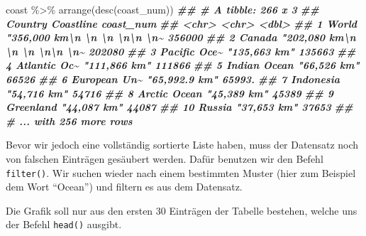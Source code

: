 \documentclass[11pt,german,a4paper]{article}
\newenvironment{Shaded}{\begin{snugshade}}{\end{snugshade}}
\newcommand{\DocumentationTok}[1]{\textcolor[rgb]{0.56,0.35,0.01}{\textbf{\textit{#1}}}}
\newcommand{\FunctionTok}[1]{\textcolor[rgb]{0.00,0.00,0.00}{#1}}
\newcommand{\NormalTok}[1]{#1}
\newcommand{\SpecialCharTok}[1]{\textcolor[rgb]{0.00,0.00,0.00}{#1}}
\begin{document}
\begin{Shaded}
\begin{Highlighting}[]
\NormalTok{coast }\SpecialCharTok{\%\textgreater{}\%}
  \FunctionTok{arrange}\NormalTok{(}\FunctionTok{desc}\NormalTok{(coast\_num))}
\DocumentationTok{\#\# \# A tibble: 266 x 3}
\DocumentationTok{\#\#    Country      Coastline                                              coast\_num}
\DocumentationTok{\#\#    \textless{}chr\textgreater{}        \textless{}chr\textgreater{}                                                      \textless{}dbl\textgreater{}}
\DocumentationTok{\#\#  1 World        "356,000 km\textbackslash{}n          \textbackslash{}n          \textbackslash{}n        \textbackslash{}n\textbackslash{}n  \textbackslash{}n\textasciitilde{}   356000 }
\DocumentationTok{\#\#  2 Canada       "202,080 km\textbackslash{}n          \textbackslash{}n          \textbackslash{}n        \textbackslash{}n\textbackslash{}n  \textbackslash{}n\textasciitilde{}   202080 }
\DocumentationTok{\#\#  3 Pacific Oce\textasciitilde{} "135,663 km"                                             135663 }
\DocumentationTok{\#\#  4 Atlantic Oc\textasciitilde{} "111,866 km"                                             111866 }
\DocumentationTok{\#\#  5 Indian Ocean "66,526 km"                                               66526 }
\DocumentationTok{\#\#  6 European Un\textasciitilde{} "65,992.9 km"                                             65993.}
\DocumentationTok{\#\#  7 Indonesia    "54,716 km"                                               54716 }
\DocumentationTok{\#\#  8 Arctic Ocean "45,389 km"                                               45389 }
\DocumentationTok{\#\#  9 Greenland    "44,087 km"                                               44087 }
\DocumentationTok{\#\# 10 Russia       "37,653 km"                                               37653 }
\DocumentationTok{\#\# \# ... with 256 more rows}
\end{Highlighting}
\end{Shaded}

Bevor wir jedoch eine vollständig sortierte Liste haben, muss der Datensatz noch von falschen Einträgen gesäubert werden. Dafür benutzen wir den Befehl \texttt{filter()}. Wir suchen wieder nach einem bestimmten Muster (hier zum Beispiel dem Wort ``Ocean'') und filtern es aus dem Datensatz.

Die Grafik soll nur aus den ersten 30 Einträgen der Tabelle bestehen, welche uns der Befehl \texttt{head()} ausgibt.
\end{document}
